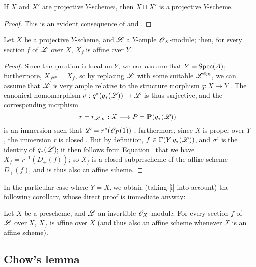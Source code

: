 \begin{proposition}[5.5.6]
\label{II.5.5.6}
If $X$ and $X'$ are projective $Y$-schemes, then $X\sqcup X'$ is a projective $Y$-scheme.
\end{proposition}

\begin{proof}
This is an evident consequence of  and .
\end{proof}

\begin{proposition}[5.5.7]
\label{II.5.5.7}
Let $X$ be a projective $Y$-scheme, and $\mathscr{L}$ a $Y$-ample $\mathscr{O}_X$-module; then, for every section $f$ of $\mathscr{L}$ over $X$, $X_f$ is affine over $Y$.
\end{proposition}

\begin{proof}
Since the question is local on $Y$, we can assume that $Y=\operatorname{Spec}(A)$; furthermore, $X_{f^{\otimes n}}=X_f$, so by replacing $\mathscr{L}$ with some suitable $\mathscr{L}^{\otimes n}$, we can assume that $\mathscr{L}$ is very ample relative to the structure morphism $q:X\to Y$ .
The canonical homomorphism $\sigma:q^*(q_*(\sh{L}))\to\sh{L}$ is thus surjective, and the corresponding morphism
\[
  r=r_{\sh{L},\sigma}:X\to P=\bb{P}(q_*(\sh{L}))
\]
is an immersion such that $\mathscr{L}=r^*(\mathscr{O}_P(1))$ ; furthermore, since $X$ is proper over $Y$, the immersion $r$ is closed .
But by definition, $f\in\Gamma(Y,q_*(\mathscr{L}))$, and $\sigma^\flat$ is the identity of $q_*(\mathscr{L})$; it then follows from Equation~ that we have $X_f=r^{-1}(D_+(f))$;
so $X_f$ is a closed subprescheme of the affine scheme $D_+(f)$, and is thus also an affine scheme.
\end{proof}

In the particular case where $Y=X$, we obtain (taking [i] into account) the following corollary, whose direct proof is immediate anyway:
\begin{corollary}[5.5.8]
\label{II.5.5.8}
Let $X$ be a prescheme, and $\mathscr{L}$ an invertible $\mathscr{O}_X$-module.
For every section $f$ of $\mathscr{L}$ over $X$, $X_f$ is affine over $X$ (and thus also an affine scheme whenever $X$ is an affine scheme).
\end{corollary}

\subsection{Chow's lemma}
\label{subsection:II.5.6}


